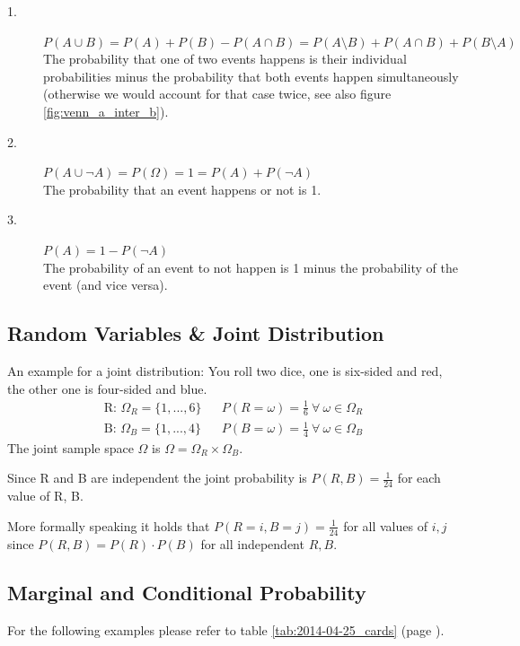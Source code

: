 \begin{description}
  \item[1.] $P(A \cup B) = P(A) + P(B) - P(A \cap B) = P(A \setminus B) + P(A \cap B) + P(B \setminus A)$
            \\ The probability that one of two events happens is their individual probabilities minus the probability that both events happen simultaneously (otherwise we would account for that case twice, see also figure \nolinebreak\ref{fig:venn_a_inter_b}).
  \item[2.] $P(A \cup \neg A) = P(\Omega) = 1 = P(A) + P(\neg A)$
            \\ The probability that an event happens or not is 1.
  \item[3.] $P(A) = 1 - P(\neg A)$
            \\ The probability of an event to not happen is 1 minus the probability of the event (and vice versa).
\end{description}

\subsection{Random Variables \& Joint Distribution}
An example for a joint distribution: You roll two dice, one is six-sided and red, the other one is four-sided and blue.
\begin{align*}
\mbox{R: }\Omega_R = \{1, ..., 6\} & & P(R=\omega) = \frac{1}{6}\ \forall\ \omega \in \Omega_R\\
\mbox{B: }\Omega_B = \{1, ..., 4\} & & P(B=\omega) = \frac{1}{4}\ \forall\ \omega \in \Omega_B
\end{align*}
The joint sample space $\Omega$ is $\Omega = \Omega_R \times \Omega_B$.

Since R and B are independent the joint probability is $ P(R, B) = \frac{1}{24}$ for each value of R, B.

More formally speaking it holds that $P(R=i, B=j) = \frac{1}{24}$ for all values of $i, j$ since $P(R, B) = P(R) \cdot P(B)$ for all independent $R, B$.



\subsection{Marginal and Conditional Probability}
For the following examples please refer to table \ref{tab:2014-04-25_cards} (page \pageref{tab:2014-04-25_cards}).


